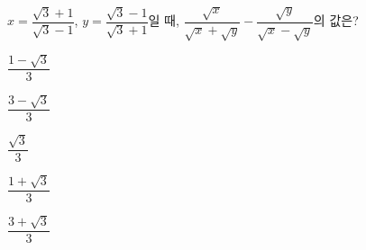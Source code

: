 \hspace*{2mm}\begin{minipage}[t]{\dimexpr\linewidth-2mm\relax}\vspace{0pt}
$x=\dfrac{\sqrt{3}+1}{\sqrt{3}-1}$, $y=\dfrac{\sqrt{3}-1}{\sqrt{3}+1}$일 때, $\dfrac{\sqrt{x}}{\sqrt{x}+\sqrt{y}}-\dfrac{\sqrt{y}}{\sqrt{x}-\sqrt{y}}$의 값은?
\begin{choices32}{\rule[-3ex]{0pt}{8ex}$\dfrac{1-\sqrt{3}}{3}$}{\rule[-3ex]{0pt}{8ex}$\dfrac{3-\sqrt{3}}{3}$}{\rule[-3ex]{0pt}{8ex}$\dfrac{\sqrt{3}}{3}$}{\rule[-3ex]{0pt}{8ex}$\dfrac{1+\sqrt{3}}{3}$}{\rule[-3ex]{0pt}{8ex}$\dfrac{3+\sqrt{3}}{3}$}\end{choices32}\end{minipage}
